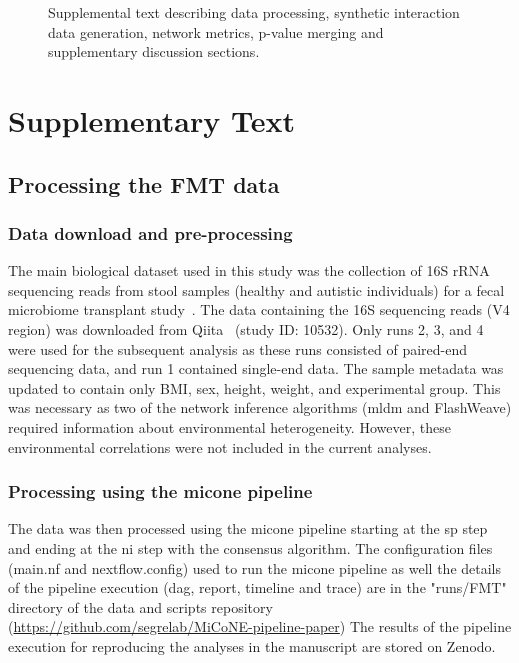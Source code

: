 \documentclass[letterpaper,12pt]{article}
\begin{document}
  \setcounter{figure}{0}
  \renewcommand{\figurename}{Text}
  \renewcommand{\thefigure}{S\arabic{figure}}
  \begin{figure}[H]
    \centering
    \caption{Supplemental text describing data processing, synthetic interaction data generation, network metrics, p-value merging and supplementary discussion sections.}
    \label{txt:text_s1}
  \end{figure}

\newpage
\section*{Supplementary Text}

  \subsection*{Processing the FMT data}

    \subsubsection*{Data download and pre-processing}
    The main biological dataset used in this study was the collection of 16S rRNA sequencing reads from stool samples (healthy and autistic individuals) for a fecal microbiome transplant study~\cite{Kang2017}.
    The data containing the 16S sequencing reads (V4 region) was downloaded from Qiita~\cite{gonzalezQiitaRapidWebenabled2018} (study ID: 10532).
    Only runs 2, 3, and 4 were used for the subsequent analysis as these runs consisted of paired-end sequencing data, and run 1 contained single-end data.
    The sample metadata was updated to contain only BMI, sex, height, weight, and experimental group.
    This was necessary as two of the network inference algorithms (\acs{mldm} and FlashWeave) required information about environmental heterogeneity.
    However, these environmental correlations were not included in the current analyses.

    \subsubsection*{Processing using the \ac{micone} pipeline}
    The data was then processed using the \ac{micone} pipeline starting at the \ac{sp} step and ending at the \ac{ni} step with the consensus algorithm.
    The configuration files (main.nf and nextflow.config) used to run the \ac{micone} pipeline as well the details of the pipeline execution (dag, report, timeline and trace) are in the "runs/FMT" directory of the data and scripts repository (\href{https://github.com/segrelab/MiCoNE-pipeline-paper}{https://github.com/segrelab/MiCoNE-pipeline-paper})
    The results of the pipeline execution for reproducing the analyses in the manuscript are stored on Zenodo.
\end{document}
